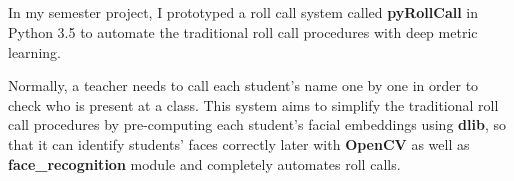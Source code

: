 \begin{center}
  \section*{\abstractname}
\end{center}
\large

In my semester project, I prototyped a roll call system called \textbf{pyRollCall} in Python 3.5 to automate
the traditional roll call procedures with deep metric learning.
\newline

Normally, a teacher needs to call each student's name one by one in order to check who is present
at a class. This system aims to simplify the traditional roll call procedures by pre-computing each
student's facial embeddings using \textbf{dlib}, so that it can identify students' faces correctly later
with \textbf{OpenCV} as well as \textbf{face\_recognition} module and completely automates roll calls.
\newline
